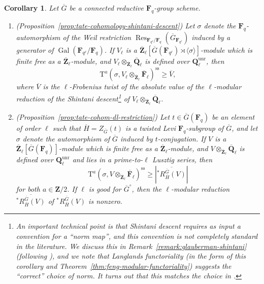 \documentclass[reqno]{amsart}
\numberwithin{equation}{subsection}
\newcommand{\F}{\mathbf{F}}
\newcommand{\Q}{\mathbf{Q}}
\newcommand{\Z}{\mathbf{Z}}
\newcommand{\Gal}{\operatorname{Gal}}
\newcommand{\ol}[1]{\overline{#1}}
\DeclareMathOperator{\unr}{unr}
\DeclareMathOperator{\Res}{Res}
\newcommand{\rT}{\ensuremath{\mathrm{T}}\xspace}
\renewcommand{\ss}{\mathrm{ss}}
\newtheorem{cor}[thm]{Corollary}
\theoremstyle{remark}
\numberwithin{equation}{subsection}
\numberwithin{figure}{subsection}
\begin{document}
\begin{cor}\label{cor:intro-tate-lower-bounds}
    Let $\ol G$ be a connected reductive $\F_q$-group scheme.
    \begin{enumerate}
        \item \emph{(Proposition~\ref{prop:tate-cohomology-shintani-descent})} Let $\sigma$ denote the $\F_q$-automorphism of the Weil restriction $\Res_{\F_{q^\ell}/\F_q}(\ol G_{\F_{q^\ell}})$ induced by a generator of $\Gal(\F_{q^\ell}/\F_q)$. If $V_\ell$ is a $\ol\Z_\ell[\ol G(\F_{q^\ell}) \rtimes \langle\sigma\rangle]$-module which is finite free as a $\ol\Z_\ell$-module, and $V_\ell \otimes_{\ol\Z_\ell} \ol\Q_\ell$ is defined over $\Q_\ell^{\unr}$, then
        \[
            \rT^a(\sigma, V_\ell \otimes_{\ol\Z_\ell} \ol\F_\ell)^{\ss} \geq \ol V,
        \]
        where $\ol V$ is the $\ell$-Frobenius twist of the absolute value of the $\ell$-modular reduction of the Shintani descent\footnote{An important technical point is that Shintani descent requires as input a convention for a ``norm map'', and this convention is not completely standard in the literature. We discuss this in Remark~\ref{remark:glauberman-shintani} (following \cite{Dig86b}), and we note that Langlands functoriality (in the form of this corollary and Theorem~\ref{thm:feng-modular-functoriality}) suggests the ``correct'' choice of norm. It turns out that this matches the choice in \cite{Kaw87}.} of $V_\ell \otimes_{\ol\Z_\ell} \ol\Q_\ell$.
        \item \emph{(Proposition~\ref{prop:tate-cohom-dl-restriction})} Let $t \in \ol G(\F_q)$ be an element of order $\ell$ such that $\ol H = Z_{\ol G}(t)$ is a twisted Levi $\F_q$-subgroup of $\ol G$, and let $\sigma$ denote the automorphism of $\ol G$ induced by $t$-conjugation. If $V$ is a $\ol\Z_\ell[\ol G(\F_q)]$-module which is finite free as a $\ol\Z_\ell$-module, and $V \otimes_{\ol\Z_\ell} \ol\Q_\ell$ is defined over $\Q_\ell^{\unr}$ and lies in a prime-to-$\ell$ Lusztig series, then
        \[
            \rT^a(\sigma, V \otimes_{\ol\Z_\ell} \ol\F_\ell)^{\ss} \geq \left|\ol{{}^*R^{\ol G}_{\ol H}(V)}\right|
        \]
        for both $a \in \Z/2$. If $\ell$ is good for $\ol G^\circ$, then the $\ell$-modular reduction $\ol{{}^*R^{\ol G}_{\ol H}(V)}$ of $^*R^{\ol G}_{\ol H}(V)$ is nonzero.
    \end{enumerate}
\end{cor}
\end{document}
